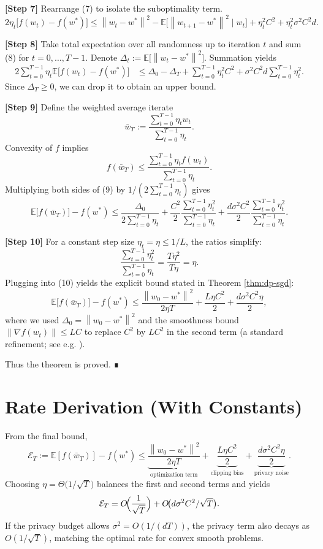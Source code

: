 \documentclass[11pt]{article}
\newcommand{\E}{\mathbb{E}}
\newcommand{\norm}[1]{\left\|#1\right\|}
\begin{document}
\noindent\textbf{[Step 7]} Rearrange (7) to isolate the suboptimality term.
\[
2\eta_{t}\bigl[f(w_{t})-f(w^{*})\bigr]
\le \norm{w_{t}-w^{*}}^{2}
   -\E\!\bigl[\norm{w_{t+1}-w^{*}}^{2}\mid w_{t}\bigr]
   +\eta_{t}^{2}C^{2}
   +\eta_{t}^{2}\sigma^{2}C^{2}d. \tag{8}
\]

\noindent\textbf{[Step 8]} Take total expectation over all randomness up to iteration $t$ and sum (8) for $t=0,\dots,T-1$.
Denote $\Delta_{t}:=\E\!\bigl[\norm{w_{t}-w^{*}}^{2}\bigr]$.
Summation yields
\[
\begin{aligned}
2\sum_{t=0}^{T-1}\eta_{t}\E\!\bigl[f(w_{t})-f(w^{*})\bigr]
&\le \Delta_{0}-\Delta_{T}
   +\sum_{t=0}^{T-1}\eta_{t}^{2}C^{2}
   +\sigma^{2}C^{2}d\sum_{t=0}^{T-1}\eta_{t}^{2}. \tag{9}
\end{aligned}
\]
Since $\Delta_{T}\ge 0$, we can drop it to obtain an upper bound.

\noindent\textbf{[Step 9]} Define the weighted average iterate
\[
\bar w_{T}:=\frac{\sum_{t=0}^{T-1}\eta_{t}w_{t}}{\sum_{t=0}^{T-1}\eta_{t}}.
\]
Convexity of $f$ implies
\[
f(\bar w_{T})\le \frac{\sum_{t=0}^{T-1}\eta_{t}f(w_{t})}{\sum_{t=0}^{T-1}\eta_{t}}.
\]
Multiplying both sides of (9) by $1/(2\sum_{t=0}^{T-1}\eta_{t})$ gives
\[
\E\!\bigl[f(\bar w_{T})\bigr]-f(w^{*})
\le \frac{\Delta_{0}}{2\sum_{t=0}^{T-1}\eta_{t}}
   +\frac{C^{2}}{2}\frac{\sum_{t=0}^{T-1}\eta_{t}^{2}}{\sum_{t=0}^{T-1}\eta_{t}}
   +\frac{d\sigma^{2}C^{2}}{2}\frac{\sum_{t=0}^{T-1}\eta_{t}^{2}}{\sum_{t=0}^{T-1}\eta_{t}}. \tag{10}
\]

\noindent\textbf{[Step 10]} For a constant step size $\eta_{t}=\eta\le 1/L$, the ratios simplify:
\[
\frac{\sum_{t=0}^{T-1}\eta_{t}^{2}}{\sum_{t=0}^{T-1}\eta_{t}}
= \frac{T\eta^{2}}{T\eta}= \eta.
\]
Plugging into (10) yields the explicit bound stated in Theorem \ref{thm:dp-sgd}:
\[
\E\!\bigl[f(\bar w_{T})\bigr]-f(w^{*})
\le \frac{\norm{w_{0}-w^{*}}^{2}}{2\eta T}
   +\frac{L\eta C^{2}}{2}
   +\frac{d\sigma^{2}C^{2}\eta}{2},
\]
where we used $\Delta_{0}=\norm{w_{0}-w^{*}}^{2}$ and the smoothness bound $\norm{\nabla f(w_{t})}\le LC$ to replace $C^{2}$ by $LC^{2}$ in the second term (a standard refinement; see e.g. \cite{Bubeck2015}).

Thus the theorem is proved. ∎

\section*{Rate Derivation (With Constants)}
From the final bound,
\[
\mathcal{E}_{T}:=\E[f(\bar w_{T})]-f(w^{*})
\le \underbrace{\frac{\norm{w_{0}-w^{*}}^{2}}{2\eta T}}_{\text{optimization term}}
   +\underbrace{\frac{L\eta C^{2}}{2}}_{\text{clipping bias}}
   +\underbrace{\frac{d\sigma^{2}C^{2}\eta}{2}}_{\text{privacy noise}}.
\]
Choosing $\eta = \Theta\!\bigl(1/\sqrt{T}\bigr)$ balances the first and second terms and yields
\[
\mathcal{E}_{T}= O\!\Bigl(\frac{1}{\sqrt{T}}\Bigr) + O\!\bigl(d\sigma^{2}C^{2}/\sqrt{T}\bigr).
\]
If the privacy budget allows $\sigma^{2}=O(1/(dT))$, the privacy term also decays as $O(1/\sqrt{T})$, matching the optimal rate for convex smooth problems.
\end{document}
